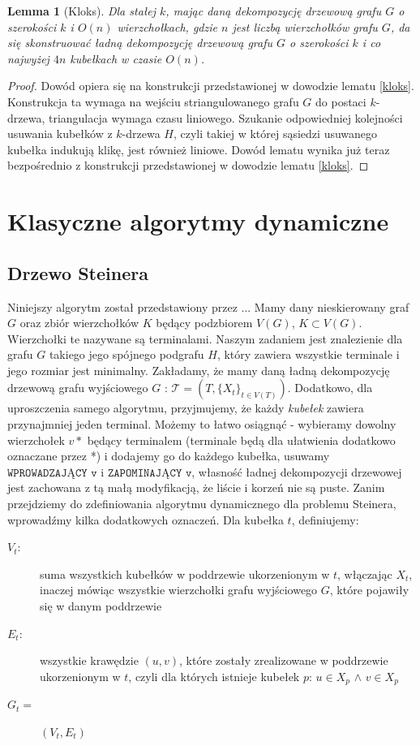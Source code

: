 \documentclass[12pt, oneside]{report}
\newtheorem{lemma}{Lemma}
\newcommand\Omicron{O}
\begin{document}
\begin{lemma}[Kloks]
Dla stałej $k$, mając daną dekompozycję drzewową grafu $G$ o szerokości $k$ i $\Omicron(n)$ wierzchołkach, gdzie $n$ jest liczbą wierzchołków grafu $G$, da się skonstruować ładną dekompozycję drzewową grafu $G$ o szerokości $k$ i co najwyżej $4n$ kubełkach w czasie $\Omicron(n)$. 
\end{lemma}

\begin{proof}
Dowód opiera się na konstrukcji przedstawionej w dowodzie lematu \ref{kloks}. Konstrukcja ta wymaga na wejściu striangulowanego grafu $G$ do postaci $k$-drzewa, triangulacja wymaga czasu liniowego. Szukanie odpowiedniej kolejności usuwania kubełków z $k$-drzewa $H$, czyli takiej w której sąsiedzi usuwanego kubełka indukują klikę, jest również liniowe. Dowód lematu wynika już teraz bezpośrednio z konstrukcji przedstawionej w dowodzie lematu \ref{kloks}.
\end{proof}

\newpage
  	\chapter{Klasyczne algorytmy dynamiczne}
    	\section{Drzewo Steinera}

Niniejszy algorytm został przedstawiony przez ... Mamy dany nieskierowany graf $G$ oraz zbiór wierzchołków $K$ będący podzbiorem $V(G)$, $K \subset V(G)$. Wierzchołki te nazywane są terminalami.
Naszym zadaniem jest znalezienie dla grafu $G$ takiego jego spójnego podgrafu $H$, który zawiera wszystkie terminale i jego rozmiar jest minimalny.
Zakładamy, że mamy daną ładną dekompozycję drzewową grafu wyjściowego $G$ : $\mathcal{T} = (T, \{X_t\}_{t \in V(T)})$. Dodatkowo, dla uproszczenia samego algorytmu, przyjmujemy, że każdy \emph{kubełek} zawiera przynajmniej jeden terminal. Możemy to łatwo osiągnąć - wybieramy dowolny wierzchołek ${v*}$ będący terminalem (terminale będą dla ułatwienia dodatkowo oznaczane przez *) i dodajemy go do każdego kubełka, usuwamy $\texttt{WPROWADZAJĄCY v}$ i $\texttt{ZAPOMINAJĄCY v}$, własność ładnej dekompozycji drzewowej jest zachowana z tą małą modyfikacją, że liście i korzeń nie są puste.
\newline
Zanim przejdziemy do zdefiniowania algorytmu dynamicznego dla problemu Steinera, wprowadźmy kilka dodatkowych oznaczeń.
Dla kubełka $t$, definiujemy:
\begin{description}
\item[$V_t:$]{suma wszystkich kubełków w poddrzewie ukorzenionym w $t$, włączając $X_t$, inaczej mówiąc wszystkie wierzchołki grafu wyjściowego $G$, które pojawiły się w danym poddrzewie}
\item[$E_t:$]{wszystkie krawędzie $(u, v)$, które zostały zrealizowane w poddrzewie ukorzenionym w $t$, czyli dla których istnieje kubełek $p$: $u \in X_p$ $\wedge$ $v \in X_p$} 
\item[$G_t = $]{$(V_t, E_t)$}
\end{description}
\end{document}
